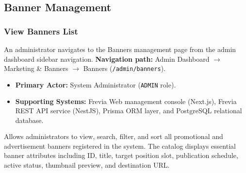 
\subsection{Banner Management}

\subsubsection{ View Banners List}

An administrator navigates to the Banners management page from the admin dashboard sidebar navigation.\newline
\textbf{Navigation path:} Admin Dashboard $\rightarrow$ Marketing \& Banners $\rightarrow$ Banners (\texttt{/admin/banners}).


\begin{itemize}[leftmargin=1.6em,topsep=3pt,itemsep=2pt,parsep=0pt,label=$\bullet$]
    \item \textbf{Primary Actor:} System Administrator (\texttt{ADMIN} role).
    \item \textbf{Supporting Systems:} Frevia Web management console (Next.js), Frevia REST API service (NestJS), Prisma ORM layer, and PostgreSQL relational database.
\end{itemize}

\noindent Allows administrators to view, search, filter, and sort all promotional and advertisement banners registered in the system. The catalog displays essential banner attributes including ID, title, target position slot, publication schedule, active status, thumbnail preview, and destination URL.

